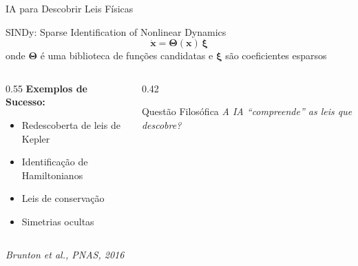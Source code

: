 \documentclass[aspectratio=169,12pt]{beamer}
\begin{document}
\begin{frame}{IA para Descobrir Leis Físicas}
    \begin{block}{SINDy: Sparse Identification of Nonlinear Dynamics}
        \begin{equation*}
            \dot{\mathbf{x}} = \boldsymbol{\Theta}(\mathbf{x}) \, \boldsymbol{\xi}
        \end{equation*}
        onde $\boldsymbol{\Theta}$ é uma biblioteca de funções candidatas e $\boldsymbol{\xi}$ são coeficientes esparsos
    \end{block}

    \begin{columns}[T]
        \begin{column}{0.55\textwidth}
            \textbf{Exemplos de Sucesso:}
            \begin{itemize}
                \item Redescoberta de leis de Kepler
                \item Identificação de Hamiltonianos
                \item Leis de conservação
                \item Simetrias ocultas
            \end{itemize}
        \end{column}
        \begin{column}{0.42\textwidth}
            \begin{alertblock}{Questão Filosófica}
                \textit{A IA ``compreende'' as leis que descobre?}
            \end{alertblock}
        \end{column}
    \end{columns}

    \vspace{0.3cm}
    \begin{center}
        \textit{Brunton et al., PNAS, 2016}
    \end{center}
\end{frame}
\end{document}
